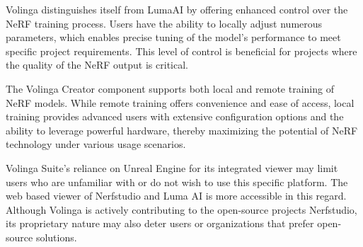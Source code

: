 Volinga distinguishes itself from LumaAI by offering enhanced control over the NeRF training process.
Users have the ability to locally adjust numerous parameters, which enables precise tuning of the model's performance to meet specific project requirements.
This level of control is beneficial for projects where the quality of the NeRF output is critical.

The Volinga Creator component supports both local and remote training of NeRF models.
While remote training offers convenience and ease of access, local training provides advanced users with extensive configuration options and the ability to leverage powerful hardware, thereby maximizing the potential of NeRF technology under various usage scenarios.

Volinga Suite's reliance on Unreal Engine for its integrated viewer may limit users who are unfamiliar with or do not wish to use this specific platform.
The web based viewer of Nerfstudio and Luma AI is more accessible in this regard.
Although Volinga is actively contributing to the open-source projects Nerfstudio, its proprietary nature may also deter users or organizations that prefer open-source solutions.
